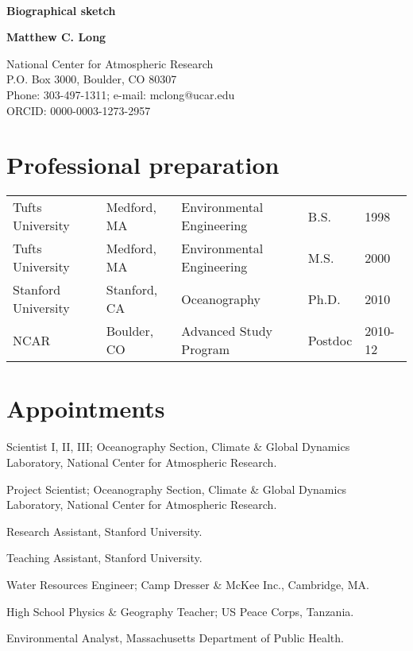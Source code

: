 \documentclass[12pt]{article}
\begin{document}
\thispagestyle{empty}

\begin{center}

\
\vspace{-2em}

\noindent
\textbf{Biographical sketch}

\textbf{Matthew C. Long}

\noindent
National Center for Atmospheric Research\\
P.O. Box 3000, Boulder, CO 80307\\
Phone: 303-497-1311; e-mail: mclong@ucar.edu\\
ORCID: 0000-0003-1273-2957
\end{center}

\vspace{-0.5em}
\section{Professional preparation}

\begin{tabular}{lllll}
Tufts University	&	Medford, MA 	& Environmental Engineering	& B.S.	& 1998 	\\
Tufts University	&  	Medford, MA		& Environmental Engineering	& M.S.	& 2000	\\
Stanford University	&	Stanford, CA	& Oceanography				& Ph.D.	& 2010 \\
NCAR & Boulder, CO & {Advanced Study Program} & Postdoc & 2010-12\\
\end{tabular}


\section{Appointments}

\begin{description}[style=multiline,leftmargin=2.8cm,font=\normalfont]
\setlength{\itemsep}{-0.3em}
\item[2014--present] {Scientist I, II, III}; Oceanography Section, Climate \& Global Dynamics \\ Laboratory, National Center for Atmospheric Research.
\item[2012--2014] {Project Scientist}; Oceanography Section, Climate \& Global Dynamics \\ Laboratory, National Center for Atmospheric Research.
\item[2005--2010] Research Assistant, Stanford University.
\item[2004--2009] Teaching Assistant, Stanford University.
\item[2003--2004] {Water Resources Engineer}; {Camp Dresser \& McKee Inc.}, Cambridge, MA.
\item[2000--2002] {High School Physics \& Geography Teacher}; US Peace Corps, Tanzania.
\item[1999--1999] Environmental Analyst, Massachusetts Department of Public Health.
\end{description}
\end{document}

